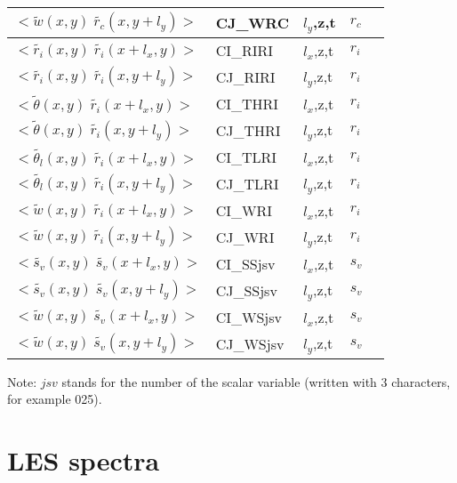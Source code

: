 \begin{longtable}[c]{|p{}|p{}|p{}|p{}|p{}|}
$<\tilde{w}(x,y)\;\tilde{r_c}(x,y+l_y)>$             & CJ\_WRC   & $l_y$,z,t & $r_c$       & \\\hline
$<\tilde{r_i}(x,y)\;\tilde{r_i}(x+l_x,y)>$           & CI\_RIRI  & $l_x$,z,t & $r_i$       & \\\hline
$<\tilde{r_i}(x,y)\;\tilde{r_i}(x,y+l_y)>$           & CJ\_RIRI  & $l_y$,z,t & $r_i$       & \\\hline
$<\tilde{\theta}(x,y)\;\tilde{r_i}(x+l_x,y)>$        & CI\_THRI  & $l_x$,z,t & $r_i$       & \\\hline
$<\tilde{\theta}(x,y)\;\tilde{r_i}(x,y+l_y)>$        & CJ\_THRI  & $l_y$,z,t & $r_i$       & \\\hline
$<\tilde{\theta_l}(x,y)\;\tilde{r_i}(x+l_x,y)>$      & CI\_TLRI  & $l_x$,z,t & $r_i$       & \\\hline
$<\tilde{\theta_l}(x,y)\;\tilde{r_i}(x,y+l_y)>$      & CJ\_TLRI  & $l_y$,z,t & $r_i$       & \\\hline
$<\tilde{w}(x,y)\;\tilde{r_i}(x+l_x,y)>$             & CI\_WRI   & $l_x$,z,t & $r_i$       & \\\hline
$<\tilde{w}(x,y)\;\tilde{r_i}(x,y+l_y)>$             & CJ\_WRI   & $l_y$,z,t & $r_i$       & \\\hline
$<\tilde{s_v}(x,y)\;\tilde{s_v}(x+l_x,y)>$           & CI\_SSjsv & $l_x$,z,t & $s_v$       & \\\hline
$<\tilde{s_v}(x,y)\;\tilde{s_v}(x,y+l_y)>$           & CJ\_SSjsv & $l_y$,z,t & $s_v$       & \\\hline
$<\tilde{w}(x,y)\;\tilde{s_v}(x+l_x,y)>$             & CI\_WSjsv & $l_x$,z,t & $s_v$       & \\\hline
$<\tilde{w}(x,y)\;\tilde{s_v}(x,y+l_y)>$             & CJ\_WSjsv & $l_y$,z,t & $s_v$       & \\\hline
\end{longtable}
\endgroup

Note: $jsv$ stands for the number of the scalar variable (written with 3 characters, for example 025).


\section{LES spectra}

